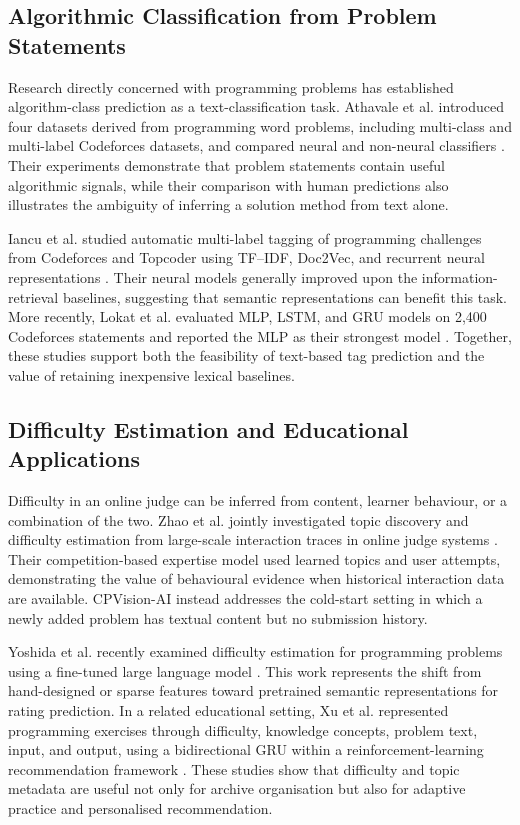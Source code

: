 \documentclass[conference]{IEEEtran}
\begin{document}
\subsection{Algorithmic Classification from Problem Statements}

Research directly concerned with programming problems has established
algorithm-class prediction as a text-classification task. Athavale et al.
introduced four datasets derived from programming word problems, including
multi-class and multi-label Codeforces datasets, and compared neural and
non-neural classifiers \cite{athavale2019}. Their experiments demonstrate that
problem statements contain useful algorithmic signals, while their comparison
with human predictions also illustrates the ambiguity of inferring a solution
method from text alone.

Iancu et al. studied automatic multi-label tagging of programming challenges
from Codeforces and Topcoder using TF--IDF, Doc2Vec, and recurrent neural
representations \cite{iancu2019}. Their neural models generally improved upon
the information-retrieval baselines, suggesting that semantic representations
can benefit this task. More recently, Lokat et al. evaluated MLP, LSTM, and GRU
models on 2,400 Codeforces statements and reported the MLP as their strongest
model \cite{lokat2023}. Together, these studies support both the feasibility of
text-based tag prediction and the value of retaining inexpensive lexical
baselines.

\subsection{Difficulty Estimation and Educational Applications}

Difficulty in an online judge can be inferred from content, learner behaviour,
or a combination of the two. Zhao et al. jointly investigated topic discovery
and difficulty estimation from large-scale interaction traces in online judge
systems \cite{zhao2018}. Their competition-based expertise model used learned
topics and user attempts, demonstrating the value of behavioural evidence when
historical interaction data are available. CPVision-AI instead addresses the
cold-start setting in which a newly added problem has textual content but no
submission history.

Yoshida et al. recently examined difficulty estimation for programming
problems using a fine-tuned large language model \cite{yoshida2024}. This work
represents the shift from hand-designed or sparse features toward pretrained
semantic representations for rating prediction. In a related educational
setting, Xu et al. represented programming exercises through difficulty,
knowledge concepts, problem text, input, and output, using a bidirectional GRU
within a reinforcement-learning recommendation framework \cite{xu2022}. These
studies show that difficulty and topic metadata are useful not only for archive
organisation but also for adaptive practice and personalised recommendation.
\end{document}
